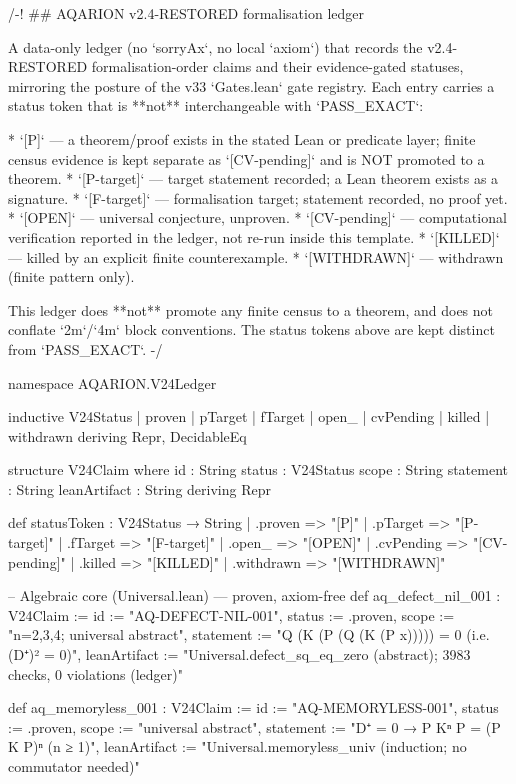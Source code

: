 /-! ## AQARION v2.4-RESTORED formalisation ledger

A data-only ledger (no `sorryAx`, no local `axiom`) that records the v2.4-RESTORED
formalisation-order claims and their evidence-gated statuses, mirroring the
posture of the v33 `Gates.lean` gate registry. Each entry carries a status token
that is **not** interchangeable with `PASS_EXACT`:

* `[P]`        — a theorem/proof exists in the stated Lean or predicate layer;
                 finite census evidence is kept separate as `[CV-pending]` and is
                 NOT promoted to a theorem.
* `[P-target]` — target statement recorded; a Lean theorem exists as a signature.
* `[F-target]` — formalisation target; statement recorded, no proof yet.
* `[OPEN]`     — universal conjecture, unproven.
* `[CV-pending]` — computational verification reported in the ledger, not
                 re-run inside this template.
* `[KILLED]`   — killed by an explicit finite counterexample.
* `[WITHDRAWN]` — withdrawn (finite pattern only).

This ledger does **not** promote any finite census to a theorem, and does not
conflate `2m`/`4m` block conventions. The status tokens above are kept distinct
from `PASS_EXACT`.
-/

namespace AQARION.V24Ledger

inductive V24Status
  | proven | pTarget | fTarget | open_ | cvPending | killed | withdrawn
  deriving Repr, DecidableEq

structure V24Claim where
  id : String
  status : V24Status
  scope : String
  statement : String
  leanArtifact : String
  deriving Repr

def statusToken : V24Status → String
  | .proven => "[P]" | .pTarget => "[P-target]" | .fTarget => "[F-target]"
  | .open_ => "[OPEN]" | .cvPending => "[CV-pending]"
  | .killed => "[KILLED]" | .withdrawn => "[WITHDRAWN]"

-- Algebraic core (Universal.lean) — proven, axiom-free
def aq_defect_nil_001 : V24Claim :=
  { id := "AQ-DEFECT-NIL-001", status := .proven, scope := "n=2,3,4; universal abstract",
    statement := "Q (K (P (Q (K (P x))))) = 0  (i.e. (D⁺)² = 0)",
    leanArtifact := "Universal.defect_sq_eq_zero (abstract); 3983 checks, 0 violations (ledger)" }

def aq_memoryless_001 : V24Claim :=
  { id := "AQ-MEMORYLESS-001", status := .proven, scope := "universal abstract",
    statement := "D⁺ = 0  →  P Kⁿ P = (P K P)ⁿ  (n ≥ 1)",
    leanArtifact := "Universal.memoryless_univ (induction; no commutator needed)" }

